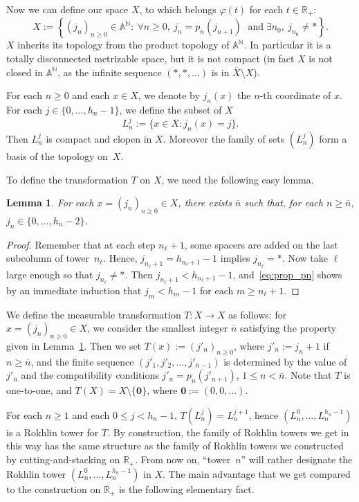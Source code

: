 \documentclass[10pt]{amsart}
\newtheorem{lemm}[theo]{Lemma}\newtheorem{prop}[theo]{Proposition}\newtheorem{coro}[theo]{Corollary}\newtheorem{conj}[theo]{Conjecture}
\theoremstyle{definition}\newtheorem{defi}[theo]{Definition}\newtheorem{rema}[theo]{Remark}\newtheorem{exam}[theo]{Example}\newtheorem{exem}[theo]{Example}\newtheorem{nota}[theo]{Notation}
\newcommand{\egdef}{:=}
\renewcommand{\AA}{\mathbb{A}}
\newcommand{\RR}{\mathbb{R}}
\newcommand{\NN}{\mathbb{N}}
\newcommand{\bz}{\boldsymbol{0}}
\let\oldexists\exists
\renewcommand*{\exists}{\mathrel{\oldexists}}
\let\oldforall\forall
\renewcommand*{\forall}{\mathrel{\oldforall}}
\begin{document}
Now we can define our space $X$, to which belongs $\varphi(t)$ for each $t\in\RR_+$:
\[
X\egdef \left\{(j_n)_{n\ge0}\in\AA^{\NN}:\ \forall n\ge0,\ j_n=p_n(j_{n+1})\;\text{ and}\;\exists n_0,\ j_{n_0}\neq\ast \right\}.
\]
$X$ inherits its topology from the product topology of $\AA^{\NN}$. In particular it is a totally disconnected metrizable space, but it is not compact (in fact $X$ is not closed in $\AA^{\NN}$, as the infinite sequence $(\ast,\ast,\ldots)$ is in $\overline{X}\setminus X$).

For each $n\ge0$ and each $x\in X$, we denote by $j_n(x)$ the $n$-th coordinate of $x$. For each $j\in\{0,\ldots,h_n-1\}$, we define the subset of $X$
\[
L_n^j\egdef\{x\in X: j_n(x)=j\}.
\]
Then $L_n^j$ is compact and clopen in $X$. Moreover the family of sets $(L_n^j)$ form a basis of the topology on~$X$.

To define the transformation $T$ on $X$, we need the following easy lemma.

\begin{lemm}\label{lemma:defT}
For each $x=(j_n)_{n\ge0}\in X$, there exists $\overline{n}$ such that, for each $n\ge \overline{n}$, $j_n \in \{0,\ldots,h_n-2\}$.
\end{lemm}

\begin{proof}
Remember that at each step $n_{\ell}+1$, some spacers are added on the last subcolumn of tower~$n_\ell$. Hence, $j_{n_\ell+1}=h_{n_\ell+1}-1$ implies $j_{n_\ell}= \ast$. Now take $\ell$ large enough so that $j_{n_\ell}\neq \ast$. Then $j_{n_\ell+1}<h_{n_\ell+1}-1$, and~\eqref{eq:prop_pn} shows by an immediate induction that $j_m < h_m-1$ for each $m\ge n_\ell+1$.
\end{proof}

We define the measurable transformation $T:X\to X$ as follows: for $x=(j_n)_{n\ge0}\in X$, we consider the smallest integer $\overline{n}$ satisfying the property given in Lemma~\ref{lemma:defT}. Then we set $T(x)\egdef (j'_n)_{n\ge0}$, where $j'_n\egdef j_n+1$ if $n\ge\overline{n}$, and the finite sequence $(j'_1,j'_2,\ldots,j'_{\overline{n}-1})$ is determined by the value of $j'_{\overline{n}}$ and the compatibility conditions $j'_n=p_n(j'_{n+1})$, $1\le n<\overline{n}$. Note that $T$ is one-to-one, and $T(X)=X\setminus\{\bz\}$, where $\bz\egdef(0,0,\ldots)$.

For each $n\ge1$ and each $0\le j<h_n-1$, $T(L_n^j)=L_n^{j+1}$, hence $(L_n^0,\ldots,L_n^{h_n-1})$ is a Rokhlin tower for $T$. By construction, the family of Rokhlin towers we get in this way has the same structure as the family of Rokhlin towers we constructed by cutting-and-stacking on $\RR_+$. From now on, ``tower~$n$'' will rather designate the Rokhlin tower $(L_n^0,\ldots,L_n^{h_n-1})$ in $X$. The main advantage that we get compared to the construction on $\RR_+$ is the following elementary fact.
\end{document}
